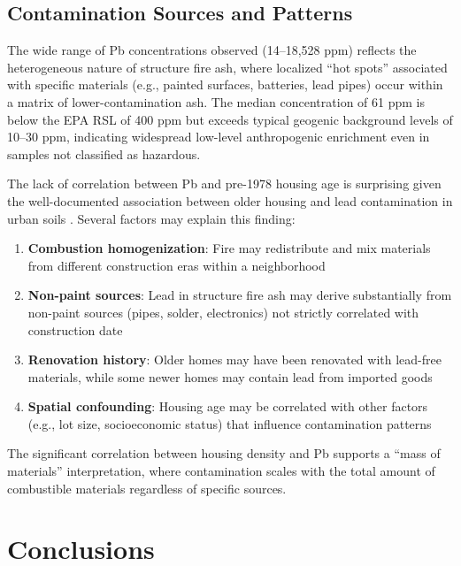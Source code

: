 \documentclass[12pt,letterpaper]{article}
\begin{document}
\subsection{Contamination Sources and Patterns}

The wide range of Pb concentrations observed (14--18,528 ppm) reflects the heterogeneous nature of structure fire ash, where localized ``hot spots'' associated with specific materials (e.g., painted surfaces, batteries, lead pipes) occur within a matrix of lower-contamination ash. The median concentration of 61 ppm is below the EPA RSL of 400 ppm but exceeds typical geogenic background levels of 10--30 ppm, indicating widespread low-level anthropogenic enrichment even in samples not classified as hazardous.

The lack of correlation between Pb and pre-1978 housing age is surprising given the well-documented association between older housing and lead contamination in urban soils \citep{Mielke1999}. Several factors may explain this finding:

\begin{enumerate}
    \item \textbf{Combustion homogenization}: Fire may redistribute and mix materials from different construction eras within a neighborhood
    \item \textbf{Non-paint sources}: Lead in structure fire ash may derive substantially from non-paint sources (pipes, solder, electronics) not strictly correlated with construction date
    \item \textbf{Renovation history}: Older homes may have been renovated with lead-free materials, while some newer homes may contain lead from imported goods
    \item \textbf{Spatial confounding}: Housing age may be correlated with other factors (e.g., lot size, socioeconomic status) that influence contamination patterns
\end{enumerate}

The significant correlation between housing density and Pb supports a ``mass of materials'' interpretation, where contamination scales with the total amount of combustible materials regardless of specific sources.


\section{Conclusions}
\end{document}

